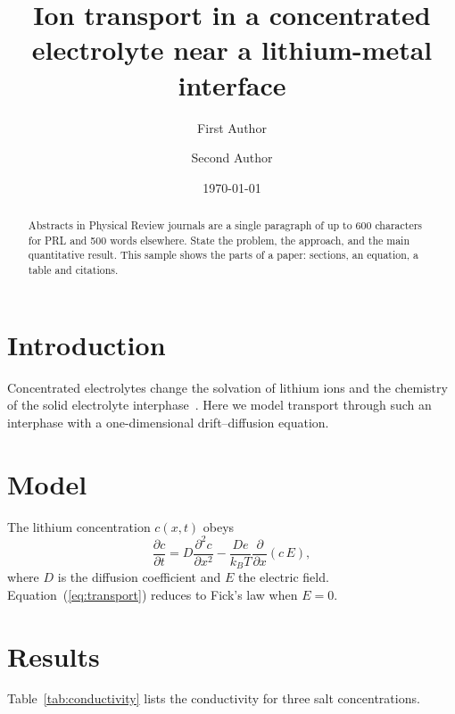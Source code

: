 \documentclass[aps,prb,reprint,superscriptaddress,amsmath,amssymb]{revtex4-2}
\begin{document}
\title{Ion transport in a concentrated electrolyte near a lithium-metal interface}

\author{First Author}
\author{Second Author}

\date{\today}

\begin{abstract}
Abstracts in Physical Review journals are a single paragraph of up to 600 characters for
PRL and 500 words elsewhere. State the problem, the approach, and the main quantitative
result. This sample shows the parts of a paper: sections, an equation, a table and citations.
\end{abstract}

\maketitle

\section{Introduction}
Concentrated electrolytes change the solvation of lithium ions and the chemistry of the solid
electrolyte interphase~\cite{yamada2019,xu2004}. Here we model transport through such an
interphase with a one-dimensional drift--diffusion equation.

\section{Model}
The lithium concentration $c(x,t)$ obeys
\begin{equation}
  \frac{\partial c}{\partial t} = D \frac{\partial^2 c}{\partial x^2}
  - \frac{D e}{k_B T} \frac{\partial}{\partial x}\left(c \, E\right),
  \label{eq:transport}
\end{equation}
where $D$ is the diffusion coefficient and $E$ the electric field. Equation~(\ref{eq:transport})
reduces to Fick's law when $E = 0$.

\section{Results}
Table~\ref{tab:conductivity} lists the conductivity for three salt concentrations.
\end{document}
